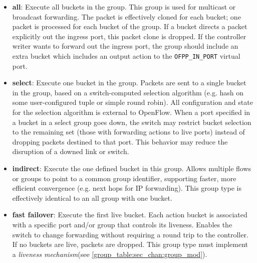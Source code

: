 \documentclass[10pt]{article}
\begin{document}
\begin{itemize}
\item \textbf{all}: Execute all buckets in the group.  This group is used for multicast or broadcast forwarding.  The packet is effectively cloned for each bucket; one packet is processed for each bucket of the group.  If a bucket directs a packet explicitly out the ingress port, this packet clone is dropped.  If the controller writer wants to forward out the ingress port, the group should include an extra bucket which includes an output action to the \verb|OFPP_IN_PORT| virtual port.
\item \textbf{select}: Execute one bucket in the group.  Packets are sent to a single bucket in the group, based on a switch-computed selection algorithm (e.g. hash on some user-configured tuple or simple round robin).  All configuration and state for the selection algorithm is external to OpenFlow.  When a port specified in a bucket in a select group goes down, the switch may restrict bucket selection to the remaining set (those with forwarding actions to live ports) instead of dropping packets destined to that port. This behavior may reduce the disruption of a downed link or switch.
\item \textbf{indirect}: Execute the one defined bucket in this group.  Allows multiple flows or groups to point to a common group identifier, supporting faster, more efficient convergence (e.g. next hops for IP forwarding).  This group type is effectively identical to an all group with one bucket.
\item \textbf{fast failover}: Execute the first live bucket.  Each action bucket is associated with a specific port and/or group that controls its liveness.  Enables the switch to change forwarding without requiring a round trip to the controller.  If no buckets are live, packets are dropped. This group type must implement a \textit{liveness mechanism}(see \ref{group_table:sec_chan:group_mod}).
\end{itemize}
\end{document}
